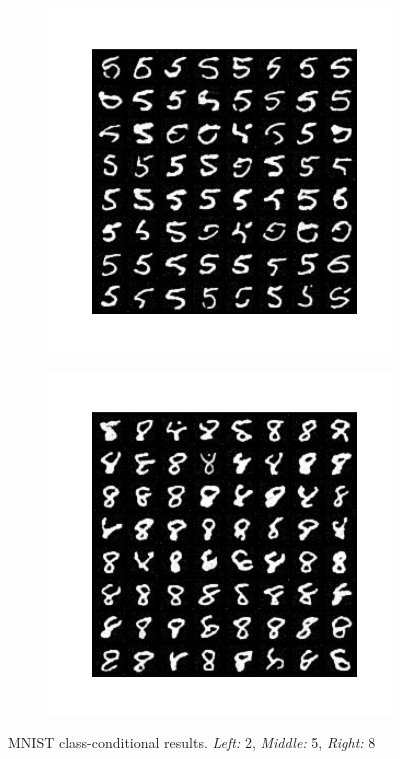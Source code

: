 \begin{figure}
\begin{subfigure}{0.3\textwidth}
        \includegraphics[width=\textwidth]{Chapters/figures/experiments/mnist/mnist_5.png}
    \end{subfigure}
    \begin{subfigure}{0.3\textwidth} \label{abb:1a}
        \centering
        \includegraphics[width=\textwidth]{Chapters/figures/experiments/mnist/mnist_8.png}
    \end{subfigure}
    
    \caption[MNIST class-conditional results]{MNIST class-conditional results. \textit{Left:} 2, \textit{Middle:} 5, \textit{Right:} 8}
    \label{fig:my_label}
\end{figure}
%

